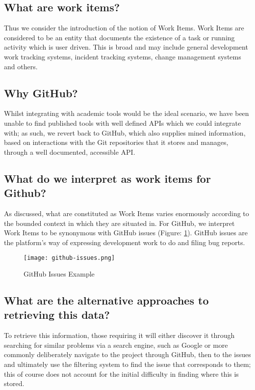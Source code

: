 
\subsection{What are work items?}

Thus we consider the introduction of the notion of Work Items. Work Items are considered to be an entity that documents the existence of a task or running activity which is user driven. This is broad and may include general development work tracking systems, incident tracking systems, change management systems and others.

\subsection{Why GitHub?}

Whilst integrating with academic tools would be the ideal scenario, we have been unable to find published tools with well defined APIs which we could integrate with; as such, we revert back to GitHub, which also supplies mined information, based on interactions with the Git repositories that it stores and manages, through a well documented, accessible API.

\subsection{What do we interpret as work items for Github?}

As discussed, what are constituted as Work Items varies enormously according to the bounded context in which they are situated in. For GitHub, we interpret Work Items to be synonymous with GitHub issues (Figure: \ref{fig:githubIssuesExample}). GitHub issues are the platform's way of expressing development work to do and filing bug reports.

\begin{figure}[h!]
	\centering
	\texttt{[image: github-issues.png]}
	\label{fig:githubIssuesExample}
	\caption{GitHub Issues Example}

\end{figure}

\subsection{What are the alternative approaches to retrieving this data?}

To retrieve this information, those requiring it will either discover it through searching for similar problems via a search engine, such as Google or more commonly deliberately navigate to the project through GitHub, then to the issues and ultimately use the filtering system to find the issue that corresponds to them; this of course does not account for the initial difficulty in finding where this is stored.

